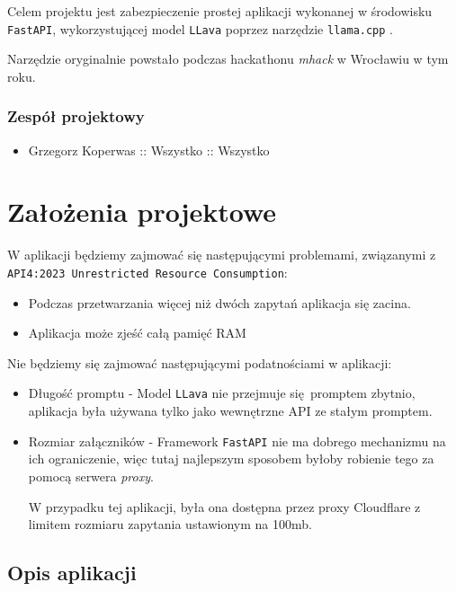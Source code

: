\documentclass[12pt,a4paper]{article}
\begin{document}
Celem projektu jest zabezpieczenie prostej aplikacji wykonanej w środowisku
\texttt{FastAPI}, wykorzystującej model \texttt{LLava}
\cite{liu2023improvedllava} poprzez narzędzie \texttt{llama.cpp}
\cite{llamacpp}.

Narzędzie oryginalnie powstało podczas hackathonu \emph{mhack} w Wrocławiu w tym
roku.

\subsubsection{Zespół projektowy}

\begin{itemize}
  \item Grzegorz Koperwas :: Wszystko :: Wszystko
\end{itemize}

\newpage

\section{Założenia projektowe}

W aplikacji będziemy zajmować się następującymi problemami, związanymi z
\texttt{API4:2023 Unrestricted Resource Consumption}:

\begin{itemize}
  \item Podczas przetwarzania więcej niż dwóch zapytań aplikacja się zacina.
  \item Aplikacja może zjeść całą pamięć RAM
\end{itemize}

Nie będziemy się zajmować następującymi podatnościami w aplikacji:

\begin{itemize}
  \item Długość promptu - Model \texttt{LLava} nie przejmuje się promptem
    zbytnio, aplikacja była używana tylko jako wewnętrzne API ze stałym promptem.
  \item Rozmiar załączników - Framework \texttt{FastAPI} nie ma dobrego
    mechanizmu na ich ograniczenie, więc tutaj najlepszym sposobem byłoby robienie 
    tego za pomocą serwera \emph{proxy}.

    W przypadku tej aplikacji, była ona dostępna przez proxy Cloudflare z
    limitem rozmiaru zapytania ustawionym na 100mb.
\end{itemize}

\subsection{Opis aplikacji}
\end{document}
